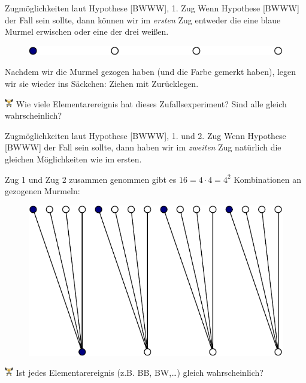 \documentclass[
  ngerman,
  ignorenonframetext,
]{beamer}
\begin{document}
\begin{frame}{Zugmöglichkeiten laut Hypothese {[}BWWW{]}, 1. Zug}
\protect\hypertarget{zugmuxf6glichkeiten-laut-hypothese-bwww-1.-zug}{}
Wenn Hypothese {[}BWWW{]} der Fall sein sollte, dann können wir im
\emph{ersten} Zug entweder die eine blaue Murmel erwischen oder eine der
drei weißen.

\begin{figure}[H]
\includegraphics[width=0.7\linewidth]{unnamed-chunk-8-1} \end{figure}

Nachdem wir die Murmel gezogen haben (und die Farbe gemerkt haben),
legen wir sie wieder ins Säckchen: Ziehen mit Zurücklegen.

\includegraphics[width=1em]{../img/weight.pdf} Wie viele
Elementarereignis hat dieses Zufallsexperiment? Sind alle gleich
wahrscheinlich?
\end{frame}

\begin{frame}{Zugmöglichkeiten laut Hypothese {[}BWWW{]}, 1. und 2. Zug}
\protect\hypertarget{zugmuxf6glichkeiten-laut-hypothese-bwww-1.-und-2.-zug}{}
Wenn Hypothese {[}BWWW{]} der Fall sein sollte, dann haben wir im
\emph{zweiten} Zug natürlich die gleichen Möglichkeiten wie im ersten.

Zug 1 und Zug 2 zusammen genommen gibt es \(16=4\cdot4=4^2\)
Kombinationen an gezogenen Murmeln:

\begin{figure}[H]
\includegraphics[width=0.5\linewidth]{unnamed-chunk-9-1} \end{figure}

\includegraphics[width=1em]{../img/weight.pdf} Ist jedes
Elementarereignis (z.B. BB, BW,\ldots) gleich wahrscheinlich?
\end{frame}
\end{document}
